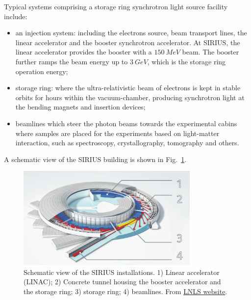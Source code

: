 Typical systems comprising a storage ring synchrotron light source facility include:
\begin{itemize}
    \item an injection system: including the electrons source, beam transport lines, the linear accelerator and the booster synchrotron accelerator. At SIRIUS, the linear accelerator provides the booster with a $150~\unit{MeV}$ beam. The booster further ramps the beam energy up to $3~\unit{GeV}$, which is the storage ring operation energy;
    \item storage ring: where the ultra-relativistic beam of electrons is kept in stable orbits for hours within the vacuum-chamber, producing synchrotron light at the bending magnets and insertion devices;
    \item beamlines which steer the photon beams towards the experimental cabins where samples are placed for the experiments based on light-matter interaction, such as spectroscopy, crystallography, tomography and others.
\end{itemize}
A schematic view of the SIRIUS building is shown in Fig.~\ref{fig:sirius_layout}.
\begin{figure}[tb]
    \centering
    \includegraphics[width=0.8\textwidth]{Images/sirius_facility.png}
    \caption[Schematic view of the SIRIUS installations.]{Schematic view of the SIRIUS installations. 1) Linear accelerator (LINAC); 2) Concrete tunnel housing the booster accelerator and the storage ring; 3) storage ring; 4) beamlines. From \href{https://lnls.cnpem.br/sirius/como-funciona-o-sirius/}{LNLS website}.}
    \label{fig:sirius_layout}
\end{figure}

